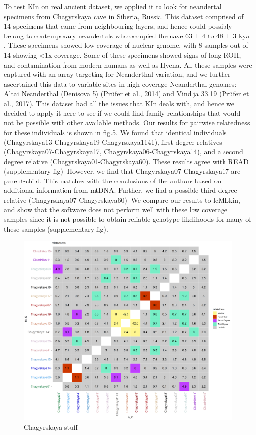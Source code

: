 \documentclass[12pt, letterpaper]{article}
\begin{document}
To test KIn on real ancient dataset, we applied it to look for neandertal specimens from Chagyrskaya cave in Siberia, Russia. This dataset comprised of 14 specimens that came from neighbouring layers, and hence could possibly belong to contemporary neandertals who occupied the cave 63 ± 4 to 48 ± 3 kya \cite{kolobova_archaeological_2020-1}. These specimens showed low coverage of nuclear genome, with 8 samples out of 14 showing <1x coverage. Some of these specimens showed signs of long ROH, and contamination from modern humans as well as Hyena. All these samples were captured with an array targeting for Neanderthal variation, and we further ascertained this data to variable sites in high coverage Neanderthal genomes: Altai Neanderthal (Denisova 5) (Prüfer et al., 2014) and Vindija 33.19 (Prüfer et al., 2017). This dataset had all the issues that KIn deals with, and hence we decided to apply it here to see if we could find family relationships that would not be possible with other available methods. Our results for pairwise relatedness for these individuals is shown in fig.5. We found that identical individuals (Chagyrskaya13-Chagyrskaya19-Chagyrskaya1141), first degree relatives (Chagyrskaya07-Chagyrskaya17, Chagyrskaya06-Chagyrskaya14), and a second degree relative (Chagyrskaya01-Chagyrskaya60). These results agree with READ (supplementary fig). However, we find that Chagyrskaya07-Chagyrskaya17 are parent-child. This matches with the conclusions of the authors based on additional information from mtDNA. Further, we find a possible third degree relative (Chagyrskaya07-Chagyrskaya60). We compare our results to lcMLkin, and show that the software does not perform well with these low coverage samples since it is not possible to obtain reliable genotype likelihoods for many of these samples (supplementary fig).



\begin{figure}[htp]
    \centering
    \includegraphics[width=18cm]{plots/plotimg/fil0_relatable_plot.png}
    \caption{Chagyrskaya stuff}
    \label{fig:galaxy}
\end{figure}
\end{document}
